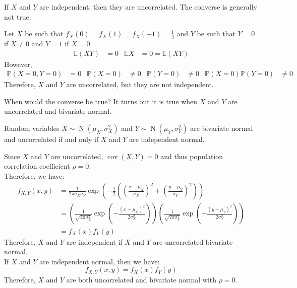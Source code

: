 \documentclass{huhtakm-template-book}
\newcommand{\prob}{\mathbb{P}}
\newcommand{\expect}{\mathbb{E}}
\DeclareMathOperator{\N}{N}
\DeclareMathOperator{\cov}{cov}
\begin{document}
\newpage
\begin{rem}
	If $X$ and $Y$ are independent, then they are uncorrelated. The converse is generally not true.
\end{rem}
\begin{eg}
	Let $X$ be such that $f_{X}(0)=f_{X}(1)=f_{X}(-1)=\frac{1}{3}$ and $Y$ be such that $Y=0$ if $X\neq0$ and $Y=1$ if $X=0$.
	\begin{align*}
		\expect(XY)&=0 &  \expect X&=0=\expect(XY)
	\end{align*}
	However,
	\begin{align*}
		\prob(X=0,Y=0)&=0 & \prob(X=0)&\neq 0 & \prob(Y=0)&\neq 0 & \prob(X=0)\prob(Y=0)&\neq 0
	\end{align*}
	Therefore, $X$ and $Y$ are uncorrelated, but they are not independent.
\end{eg}
When would the converse be true? It turns out it is true when $X$ and $Y$ are uncorrelated and bivariate normal. 
\begin{thm}
	\label{Chapter 6 (Theorem) Bivariate normal and uncorrelated}
	Random variables $X\sim\N(\mu_{X},\sigma_{X}^{2})$ and $Y\sim\N(\mu_{Y},\sigma_{Y}^{2})$ are bivariate normal and uncorrelated if and only if $X$ and $Y$ are independent normal.
\end{thm}
\begin{proofing}
	Since $X$ and $Y$ are uncorrelated, $\cov(X,Y)=0$ and thus population correlation coefficient $\rho=0$.\\
	Therefore, we have:
	\begin{align*}
		f_{X,Y}(x,y)&=\frac{1}{2\pi\sigma_{X}\sigma_{Y}}\exp\left(-\frac{1}{2}\left(\left(\frac{x-\mu_{X}}{\sigma_{X}}\right)^{2}+\left(\frac{y-\mu_{Y}}{\sigma_{Y}}\right)^{2}\right)\right)\\
		&=\left(\frac{1}{\sqrt{2\pi\sigma_{X}^{2}}}\exp\left(-\frac{(x-\mu_{X})^{2}}{2\sigma_{X}^{2}}\right)\right)\left(\frac{1}{\sqrt{2\pi\sigma_{Y}^{2}}}\exp\left(-\frac{(y-\mu_{Y})^{2}}{2\sigma_{Y}^{2}}\right)\right)\\
		&=f_{X}(x)f_{Y}(y)
	\end{align*}
	Therefore, $X$ and $Y$ are independent if $X$ and $Y$ are uncorrelated bivariate normal.\\
	If $X$ and $Y$ are independent normal, then we have:
	\begin{equation*}
		f_{X,Y}(x,y)=f_{X}(x)f_{Y}(y)
	\end{equation*}
	Therefore, $X$ and $Y$ are both uncorrelated and bivariate normal with $\rho=0$.
\end{proofing}
\end{document}
